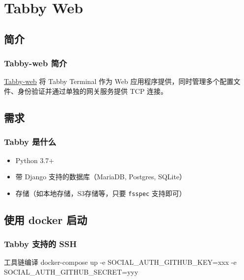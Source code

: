 \documentclass[xcolor=table,dvipsnames,svgnames,aspectratio=169]{ctexbeamer}
\begin{document}
\section{Tabby Web}

\subsection{简介}

\begin{frame}
  \frametitle{Tabby-web 简介}

  \href{https://github.com/Eugeny/tabby-web}{Tabby-web} 将 Tabby Terminal 作为 Web 应用程序提供，同时管理多个配置文件、身份验证并通过单独的网关服务提供 TCP 连接。

\end{frame}

\subsection{需求}

\begin{frame}
  \frametitle{Tabby 是什么}
  
  \begin{itemize}
    \item Python 3.7+
    \item 带 Django 支持的数据库（MariaDB, Postgres, SQLite）
    \item 存储（如本地存储，S3存储等，只要 \lstinline|fsspec| 支持即可）
  \end{itemize}
\end{frame}

\subsection{使用 docker 启动}

\begin{frame}[fragile]
  \frametitle{Tabby 支持的 SSH}
  \begin{codeblock}[language=bash]{工具链编译}
docker-compose up -e SOCIAL_AUTH_GITHUB_KEY=xxx -e SOCIAL_AUTH_GITHUB_SECRET=yyy
  \end{codeblock}

  
\end{frame}

\makebottom
\end{document}
